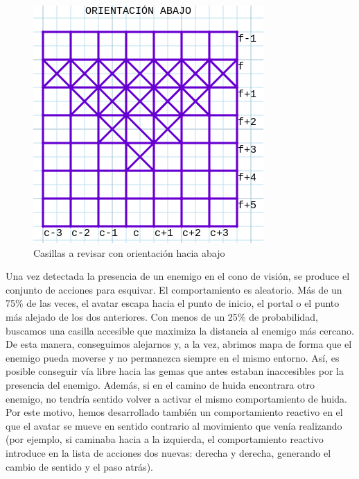 \begin{figure}[H] %
	\centering
	\includegraphics[scale=0.6]{or-abaj.png}  %
	\caption{Casillas a revisar con orientación hacia abajo} 
	\label{fig:orientación-abaj}
\end{figure}

Una vez detectada la presencia de un enemigo en el cono de visión, se produce el conjunto de acciones para esquivar. El comportamiento es aleatorio. Más de un 75\% de las veces, el avatar escapa hacia el punto de inicio, el portal o el punto más alejado de los dos anteriores. Con menos de un 25\% de probabilidad, buscamos una casilla accesible que maximiza la distancia al enemigo más cercano. De esta manera, conseguimos alejarnos y, a la vez, abrimos mapa de forma que el enemigo pueda moverse y no permanezca siempre en el mismo entorno. Así, es posible conseguir vía libre hacia las gemas que antes estaban inaccesibles por la presencia del enemigo. Además, si en el camino de huida encontrara otro enemigo, no tendría sentido volver a activar el mismo comportamiento de huida. Por este motivo, hemos desarrollado también un comportamiento reactivo en el que el avatar se mueve en sentido contrario al movimiento que venía realizando (por ejemplo, si caminaba hacia a la izquierda, el comportamiento reactivo introduce en la lista de acciones dos nuevas: derecha y derecha, generando el cambio de sentido y el paso atrás).


